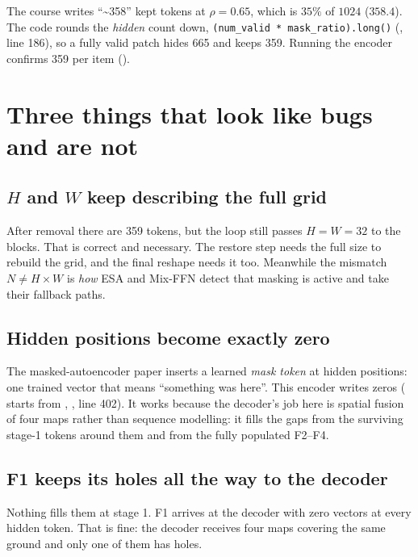 \begin{sourcenote}[: 359, not 358]
The course writes ``\textasciitilde 358'' kept tokens at $\rho = 0.65$, which is $35\%$ of $1024$ ($358.4$).
The code rounds the \emph{hidden} count down, \lstinline|(num_valid * mask_ratio).long()|
(, line 186), so a fully valid patch hides 665
and keeps 359. Running the encoder confirms 359 per item
().
\end{sourcenote}

\section{Three things that look like bugs and are not}\label{sec:encoder:notbugs}

\subsection{$H$ and $W$ keep describing the full grid}

After removal there are 359 tokens, but the loop still passes $H = W = 32$ to the blocks. That is
correct and necessary. The restore step needs the full size to rebuild the grid, and the final reshape
needs it too. Meanwhile the mismatch $N \ne H \times W$ is \emph{how} ESA and Mix-FFN detect that
masking is active and take their fallback paths.

\subsection{Hidden positions become exactly zero}

The masked-autoencoder paper \citep{he2022masked} inserts a learned \emph{mask token}
at hidden positions: one trained vector that means ``something was here''. This encoder writes zeros
( starts from , , line 402). It works
because the decoder's job here is spatial fusion of four maps rather than sequence modelling: it
fills the gaps from the surviving stage-1 tokens around them and from the fully populated F2--F4.

\subsection{F1 keeps its holes all the way to the decoder}

Nothing fills them at stage 1. F1 arrives at the decoder with zero vectors at every hidden token. That
is fine: the decoder receives four maps covering the same ground and only one of them has holes.

